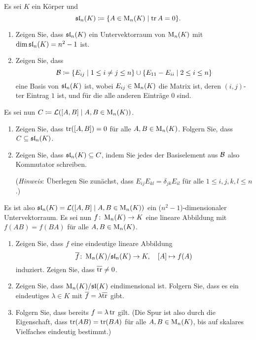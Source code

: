 \documentclass[a4paper,10pt]{scrartcl}
\begin{document}
\begin{question}
  Es sei $K$ ein Körper und
  \[
              \mathfrak{sl}_n(K)
    \coloneqq \{ A \in \operatorname{M}_n(K) \mid \operatorname{tr} A = 0 \}.
  \]
  \begin{enumerate}
    \item
      Zeigen Sie, dass $\mathfrak{sl}_n(K)$ ein Untervektorraum von $\operatorname{M}_n(K)$ mit $\dim \mathfrak{sl}_n(K) = n^2 - 1$ ist.
    \item
      Zeigen Sie, dass
      \[
        \mathcal{B}
        \coloneqq
              \{ E_{ij} \mid 1 \leq i \neq j \leq n \}
        \cup  \{ E_{11} - E_{ii} \mid 2 \leq i \leq n \}
      \]
      eine Basis von $\mathfrak{sl}_n(K)$ ist, wobei $E_{ij} \in \operatorname{M}_n(K)$ die Matrix ist, deren $(i,j)$-ter Eintrag $1$ ist, und für die alle anderen Einträge $0$ sind.
  \end{enumerate}
  Es sei nun $C \coloneqq \operatorname{\mathcal{L}}( [A,B] \mid A, B \in \operatorname{M}_n(K) )$.
  \begin{enumerate}[resume]
    \item
      Zeigen Sie, dass $\operatorname{tr}([A,B]) = 0$ für alle $A, B \in \operatorname{M}_n(K)$.
      Folgern Sie, dass $C \subseteq \mathfrak{sl}_n(K)$.
    \item
      Zeigen Sie, dass $\mathfrak{sl}_n(K) \subseteq C$, indem Sie jedes der Basiselement aus $\mathcal{B}$ also Kommutator schreiben.
      
      (\emph{Hinweis}:
       Überlegen Sie zunächst, dass $E_{ij} E_{kl} = \delta_{jk} E_{il}$ für alle $1 \leq i, j, k, l \leq n$.)
  \end{enumerate}
  Es ist also $\mathfrak{sl}_n(K) = \operatorname{\mathcal{L}}( [A,B] \mid A, B \in \operatorname{M}_n(K) )$ ein ($n^2 - 1$)-dimensionaler Untervektorraum.
  Es sei nun $f \colon \operatorname{M}_n(K) \to K$ eine lineare Abbildung mit $f(AB) = f(BA)$ für alle $A, B \in \operatorname{M}_n(K)$.
  \begin{enumerate}[resume]
    \item
      Zeigen Sie, dass $f$ eine eindeutige lineare Abbildung
      \[
        \overline{f} \colon \operatorname{M}_n(K) / \mathfrak{sl}_n(K) \to K,
        \quad
        [A] \mapsto f(A)
      \]
      induziert.
      Zeigen Sie, dass $\overline{\operatorname{tr}} \neq 0$.
    \item
      Zeigen Sie, dass $\operatorname{M}_n(K) / \mathfrak{sl}(K)$ eindimensional ist.
      Folgern Sie, dass es ein eindeutiges $\lambda \in K$ mit $\overline{f} = \lambda \overline{\operatorname{tr}}$ gibt.
    \item
      Folgern Sie, dass bereits $f = \lambda \operatorname{tr}$ gilt.
      (Die Spur ist also durch die Eigenschaft, dass $\operatorname{tr}(AB) = \operatorname{tr}(BA)$ für alle $A, B \in \operatorname{M}_n(K)$, bis auf skalares Vielfaches eindeutig bestimmt.)
  \end{enumerate}
\end{question}
\end{document}
